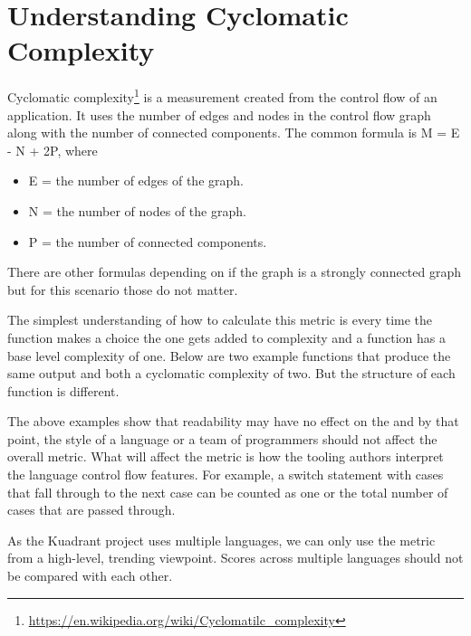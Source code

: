 \section{Understanding Cyclomatic Complexity}

Cyclomatic complexity\footnote{\href{https://en.wikipedia.org/wiki/Cyclomatic_complexity}{https://en.wikipedia.org/wiki/Cyclomatilc\_complexity}} is a measurement created from the control flow of an application.
It uses the number of edges and nodes in the control flow graph along with the number of connected components.
The common formula is M = E - N + 2P, where
\begin{itemize}
	\item E = the number of edges of the graph.
	\item N = the number of nodes of the graph.
	\item P = the number of connected components.
\end{itemize}
There are other formulas depending on if the graph is a strongly connected graph but for this scenario those do not matter.

The simplest understanding of how to calculate this metric is every time the function makes a choice the one gets added to complexity and a function has a base level complexity of one.
Below are two example functions that produce the same output and both a cyclomatic complexity of two.
But the structure of each function is different.

\begin{center}
\end{center}

The above examples show that readability may have no effect on the \cc and by that point, the style of a language or a team of programmers should not affect the overall metric.
What will affect the metric is how the tooling authors interpret the language control flow features.
For example, a switch statement with cases that fall through to the next case can be counted as one or the total number of cases that are passed through.

As the Kuadrant project uses multiple languages, we can only use the metric from a high-level, trending viewpoint.
Scores across multiple languages should not be compared with each other.


